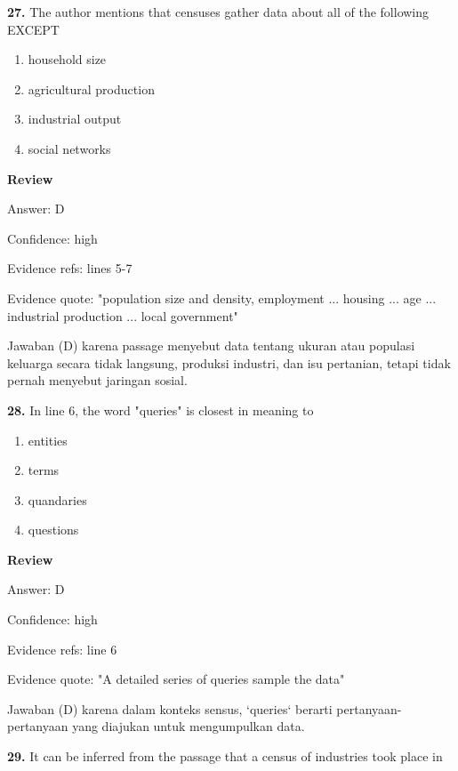 \documentclass[12pt]{article}
\begin{document}
\noindent\textbf{27.} The author mentions that censuses gather data about all of the following EXCEPT
\begin{enumerate}[label=(\Alph*),leftmargin=*,itemsep=0.2em]
\item household size
\item agricultural production
\item industrial output
\item social networks
\end{enumerate}
\par
\begingroup
\setlength{\parskip}{0pt}
\setlength{\parindent}{0pt}
\textbf{Review}\par
Answer: D\par
Confidence: high\par
Evidence refs: lines 5-7\par
Evidence quote: "population size and density, employment ... housing ... age ... industrial production ... local government"\par
Jawaban (D) karena passage menyebut data tentang ukuran atau populasi keluarga secara tidak langsung, produksi industri, dan isu pertanian, tetapi tidak pernah menyebut jaringan sosial.\par
\endgroup
\par
\vspace{0.25\baselineskip}
\noindent\textbf{28.} In line 6, the word "queries" is closest in meaning to
\begin{enumerate}[label=(\Alph*),leftmargin=*,itemsep=0.2em]
\item entities
\item terms
\item quandaries
\item questions
\end{enumerate}
\par
\begingroup
\setlength{\parskip}{0pt}
\setlength{\parindent}{0pt}
\textbf{Review}\par
Answer: D\par
Confidence: high\par
Evidence refs: line 6\par
Evidence quote: "A detailed series of queries sample the data"\par
Jawaban (D) karena dalam konteks sensus, `queries` berarti pertanyaan-pertanyaan yang diajukan untuk mengumpulkan data.\par
\endgroup
\par
\vspace{0.25\baselineskip}
\noindent\textbf{29.} It can be inferred from the passage that a census of industries took place in
\end{document}
